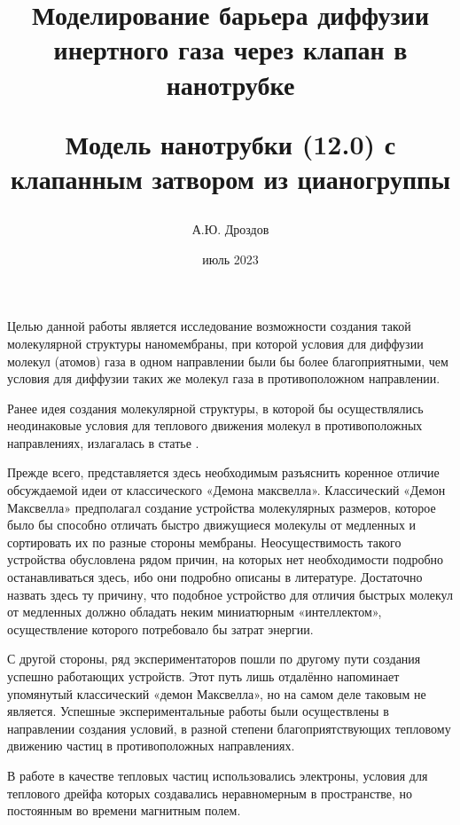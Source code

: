 \documentclass[12pt]{article}
\begin{document}
\title{Моделирование барьера диффузии инертного газа через клапан в нанотрубке

Модель нанотрубки (12.0) с клапанным затвором из цианогруппы}
\author{А.Ю. Дроздов}
\date{июль 2023}

\begin{titlepage}
\maketitle
\end{titlepage}

Целью данной работы является исследование возможности создания такой молекулярной структуры наномембраны, при которой условия для диффузии молекул (атомов) газа в одном направлении были бы более благоприятными, чем условия для диффузии таких же молекул газа в противоположном направлении.

Ранее идея создания молекулярной структуры, в которой бы осуществлялись неодинаковые условия для теплового движения молекул в противоположных направлениях, излагалась в статье \cite{Drozdov2001}.

Прежде всего, представляется здесь необходимым разъяснить коренное отличие обсуждаемой идеи от классического «Демона максвелла». Классический «Демон Максвелла» предполагал создание устройства молекулярных размеров, которое было бы способно отличать быстро движущиеся молекулы от медленных и сортировать их по разные стороны мембраны. Неосуществимость такого устройства обусловлена рядом причин, на которых нет необходимости подробно останавливаться здесь, ибо они подробно описаны в литературе. Достаточно назвать здесь ту причину, что подобное устройство для отличия быстрых молекул от медленных должно обладать неким миниатюрным «интеллектом», осуществление которого потребовало бы затрат энергии. 

С другой стороны, ряд экспериментаторов пошли по другому пути создания успешно работающих устройств. Этот путь лишь отдалённо напоминает упомянутый классический «демон Максвелла», но на самом деле таковым не является. Успешные экспериментальные работы были осуществлены в направлении создания условий, в разной степени благоприятствующих тепловому движению частиц в противоположных направлениях. 

В работе \cite{Lavrentjev1992} в качестве тепловых частиц использовались электроны, условия для теплового дрейфа которых создавались неравномерным в пространстве, но постоянным во времени магнитным полем. 

\end{document}
